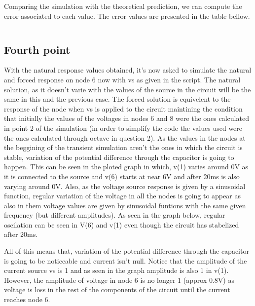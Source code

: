 \par Comparing the simulation with the theoretical prediction, we can compute the error associated to each value. The error values are presented in the table bellow.

\vspace{5mm}
\begin{table}[H]
\centering
\begin{tabularx}{0.6\textwidth} {
  | >{\raggedright\arraybackslash}X
  | >{\raggedleft\arraybackslash}X | }
 \hline

\end{tabularx}
\end{table}
\vspace{5mm}



\subsection{Fourth point}
\label{ssec:4S}

\par With the natural response values obtained, it's now asked to simulate the natural and forced response on node 6 now with vs as given in the script. The natural solution, as it doesn't varie with the values of the source in the circuit will be the same in this and the previous case. The forced solution is equivelent to the response of the node when vs is applied to the circuit maintining the condition that initially the values of the voltages in nodes 6 and 8 were the ones calculated in point 2 of the simulation (in order to simplify the code the values used were the ones calculated through octave in question 2). As the values in the nodes at the beggining of the transient simulation aren't the ones in which the circuit is stable, variation of the potential difference through the capacitor is going to happen. This can be seen in the ploted graph in which, v(1) varies around 0V as it is connected to the source and v(6) starts at near 6V and after 20ms is also varying around 0V. Also, as the voltage source response is given by a sinusoidal function, regular variation of the voltage in all the nodes is going to appear as also in them voltage values are given by sinusoidal funtions with the same given frequency (but different amplitudes). As seen in the graph below, regular oscilation can be seen in V(6) and v(1) even though the circuit has stabelized after 20ms.
\par All of this means that, variation of the potential difference through the capacitor is going to be noticeable and current isn't null. Notice that the amplitude of the current source vs is 1 and as seen in the graph amplitude is also 1 in v(1). However, the amplitude of voltage in node 6 is no longer 1 (approx 0.8V) as voltage is loss in the rest of the components of the circuit until the current reaches node 6. 

